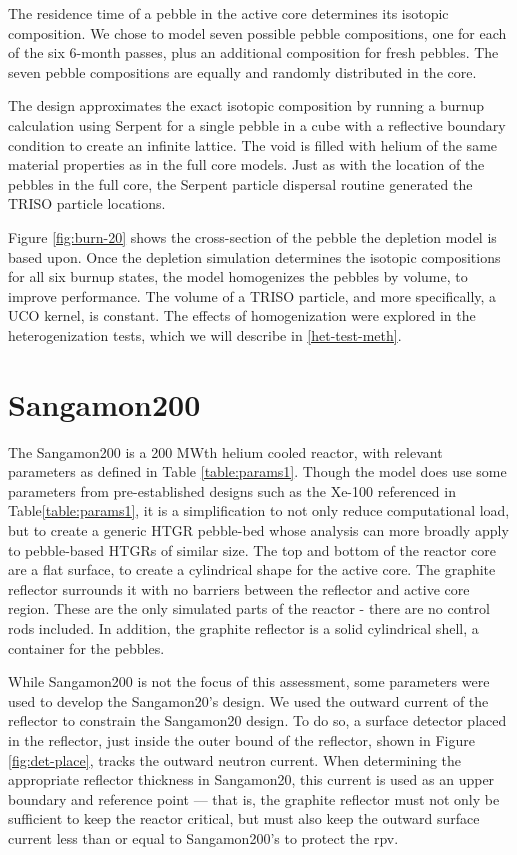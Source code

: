 The residence time of a pebble in the active core determines its isotopic composition.  We chose to model seven possible pebble compositions, one for each of the six 6-month passes, plus an additional composition for fresh pebbles.  The seven pebble compositions are equally and randomly distributed in the core.

The design approximates the exact isotopic composition by running a burnup calculation using Serpent for a single pebble in a cube with a reflective boundary condition to create an infinite lattice.  The void is filled with helium of the same material properties as in the full core models.  Just as with the location of the pebbles in the full core, the Serpent particle dispersal routine generated the TRISO particle locations.



Figure \ref{fig:burn-20} shows the cross-section of the pebble the depletion model is based upon.  Once the depletion simulation determines the isotopic compositions for all six burnup states, the model homogenizes the pebbles by volume, to improve performance.  The volume of a TRISO particle, and more specifically, a UCO kernel, is constant.  The effects of homogenization were explored in the heterogenization tests, which we will describe in \autoref{het-test-meth}.

\section{Sangamon200}
\label{s200}
The Sangamon200 is a 200 MWth helium cooled reactor, with relevant parameters as defined in Table \ref{table:params1}.  Though the model does use some parameters from pre-established designs such as the Xe-100 referenced in Table\ref{table:params1}, it is a simplification to not only reduce computational load, but to create a generic HTGR pebble-bed whose analysis can more broadly apply to pebble-based HTGRs of similar size.  The top and bottom of the reactor core are a flat surface, to create a cylindrical shape for the active core.  The graphite reflector surrounds it with no barriers between the reflector and active core region. These are the only simulated parts of the reactor - there are no control rods included.  In addition, the graphite reflector is a solid cylindrical shell, a container for the pebbles.



While Sangamon200 is not the focus of this assessment, some parameters were used to develop the Sangamon20's design.  We used the outward current of the reflector to constrain the Sangamon20 design.  To do so, a surface detector placed in the reflector, just inside the outer bound of the reflector, shown in Figure \ref{fig:det-place}, tracks the outward neutron current.  When determining the appropriate reflector thickness in Sangamon20, this current is used as an upper boundary and reference point --- that is, the graphite reflector must not only be sufficient to keep the reactor critical, but must also keep the outward surface current less than or equal to Sangamon200's to protect the \acrshort{rpv}.

